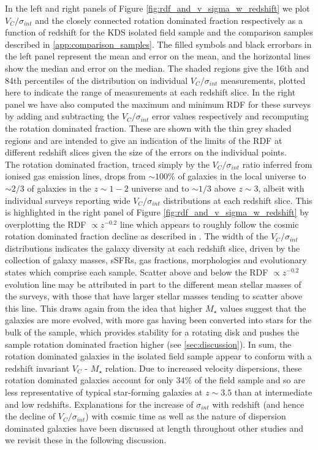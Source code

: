 \documentclass[fleqn,usenatbib]{mn2e}
\begin{document}
In the left and right panels of Figure \ref{fig:rdf_and_v_sigma_w_redshift} we plot $V_{C}/\sigma_{int}$ and the closely connected rotation dominated fraction respectively as a function of redshift for the KDS isolated field sample and the comparison samples described in \cref{app:comparison_samples}.
The filled symbols and black errorbars in the left panel represent the mean and error on the mean, and the horizontal lines show the median and error on the median.
The shaded regions give the 16th and 84th percentiles of the distribution on individual $V_{C}/\sigma_{int}$ measurements, plotted here to indicate the range of measurements at each redshift slice.
In the right panel we have also computed the maximum and minimum RDF for these surveys by adding and subtracting the $V_{C}/\sigma_{int}$ error values respectively and recomputing the rotation dominated fraction.
These are shown with the thin grey shaded regions and are intended to give an indication of the limits of the RDF at different redshift slices given the size of the errors on the individual points.\\

The rotation dominated fraction, traced simply by the $V_{C}/\sigma_{int}$ ratio inferred from ionised gas emission lines, drops from $\sim 100\%$ of galaxies in the local universe to $\sim 2/3$ of galaxies in the $z \sim 1-2$ universe and to $\sim 1/3$ above $z \sim 3$, albeit with individual surveys reporting wide $V_{C}/\sigma_{int}$ distributions at each redshift slice.
This is highlighted in the right panel of Figure \ref{fig:rdf_and_v_sigma_w_redshift} by overplotting the RDF $\propto z^{-0.2}$ line which appears to roughly follow the cosmic rotation dominated fraction decline as described in \cite{Stott2016}. 
The width of the $V_{C}/\sigma_{int}$ distributions indicates the galaxy diversity at each redshift slice, driven by the collection of galaxy masses, sSFRs, gas fractions, morphologies and evolutionary states which comprise each sample.
Scatter above and below the RDF $\propto z^{-0.2}$ evolution line may be attributed in part to the different mean stellar masses of the surveys, with those that have larger stellar masses tending to scatter above this line.
This draws again from the idea that higher $M_{\star}$ values suggest that the galaxies are more evolved, with more gas having been converted into stars for the bulk of the sample, which provides stability for a rotating disk and pushes the sample rotation dominated fraction higher (see \cref{sec:discussion}).
In sum, the rotation dominated galaxies in the isolated field sample appear to conform with a redshift invariant $V_{C}$ - $M_{\star}$ relation.
Due to increased velocity dispersions, these rotation dominated galaxies account for only $34\%$ of the field sample and so are less representative of typical star-forming galaxies at $z\sim3.5$ than at intermediate and low redshifts. 
Explanations for the increase of $\sigma_{int}$ with redshift (and hence the decline of $V_{C}/\sigma_{int}$) with cosmic time as well as the nature of dispersion dominated galaxies have been discussed at length throughout other studies \citep[e.g][]{ForsterSchreiber2009,Law2009,Burkert2010,Newman2013,Wisnioski2015} and we revisit these in the following discussion.
\end{document}
